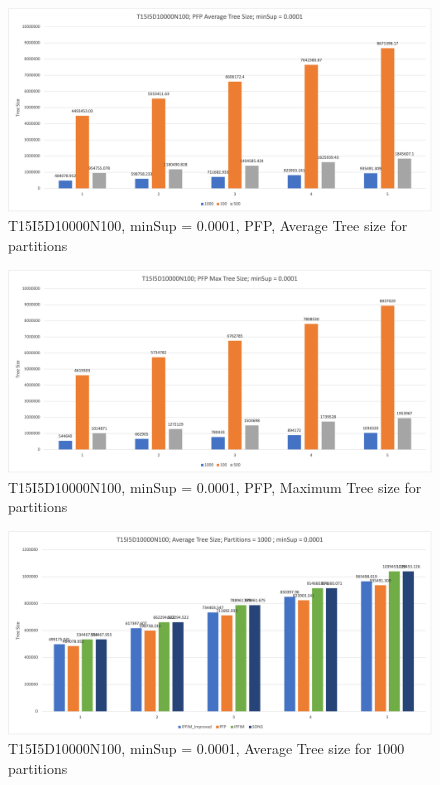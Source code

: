 \begin{figure}
  \centering
  \includegraphics[width=\linewidth]{figures/4iterations/T15I5D10000N100_AvgTree_PFP_0001}
  \caption{T15I5D10000N100, minSup = 0.0001,  PFP, Average Tree size for partitions}
  \label{fig:T15I5D10000N100_AvgTree_PFP_0001}
\end{figure}

\begin{figure}
  \centering
  \includegraphics[width=\linewidth]{figures/4iterations/T15I5D10000N100_MaxTree_PFP_0001}
  \caption{T15I5D10000N100, minSup = 0.0001,  PFP, Maximum Tree size for partitions}
  \label{fig:T15I5D10000N100_MaxTree_PFP_0001}
\end{figure}

\begin{figure}
  \centering
  \includegraphics[width=\linewidth]{figures/4iterations/T15I5D10000N100_AvgTree_Partitins1000_0001}
  \caption{T15I5D10000N100, minSup = 0.0001,  Average Tree size for 1000 partitions}
  \label{fig:T15I5D10000N100_AvgTree_Partitins1000_0001}
\end{figure}



